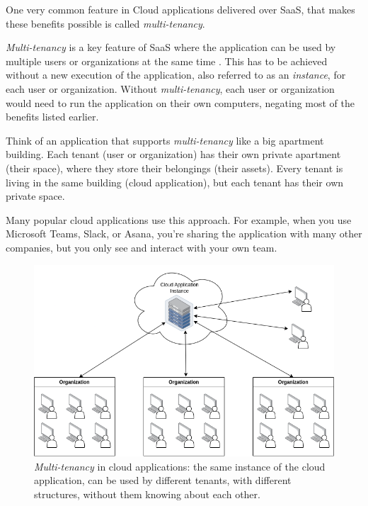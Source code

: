 One very common feature in Cloud applications delivered over SaaS, that makes these benefits possible is called \textit{multi-tenancy}.

\textit{Multi-tenancy} is a key feature of SaaS where the application can be used by multiple users or organizations at the same time
\cite[1]{Tsai2014}.
This has to be achieved without a new execution
of the application, also referred to as an \textit{instance}, for each user or organization.
Without \textit{multi-tenancy}, each user or organization would need to run the application on
their own computers,
negating most of the benefits listed earlier.


Think of an application that supports \textit{multi-tenancy} like a big apartment building.
Each tenant (user or organization) has their
own private apartment (their space), where they store their belongings (their assets).
Every tenant is living in the same building (cloud application), but each tenant has their
own private space.

Many popular cloud applications use this approach. For example, when you use Microsoft Teams,
Slack, or Asana, you're sharing the application with many other companies, but you only
see and interact with your own team.

\begin{figure}[H]
	\centering
	\includegraphics[scale=0.45]{images/mt-cloud-services.png}
	\caption{\textit{Multi-tenancy} in cloud applications: the same instance of the cloud
		application, can be used by different tenants, with different structures, without them knowing about each other.}
	\label{fig:multi-tenant=cloud-applications}
\end{figure}
\FloatBarrier

